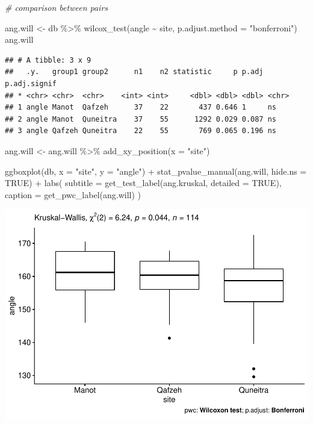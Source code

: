 \documentclass[
]{article}
\newenvironment{Shaded}{\begin{snugshade}}{\end{snugshade}}
\newcommand{\AttributeTok}[1]{\textcolor[rgb]{0.77,0.63,0.00}{#1}}
\newcommand{\CommentTok}[1]{\textcolor[rgb]{0.56,0.35,0.01}{\textit{#1}}}
\newcommand{\ConstantTok}[1]{\textcolor[rgb]{0.00,0.00,0.00}{#1}}
\newcommand{\FunctionTok}[1]{\textcolor[rgb]{0.00,0.00,0.00}{#1}}
\newcommand{\NormalTok}[1]{#1}
\newcommand{\OtherTok}[1]{\textcolor[rgb]{0.56,0.35,0.01}{#1}}
\newcommand{\SpecialCharTok}[1]{\textcolor[rgb]{0.00,0.00,0.00}{#1}}
\newcommand{\StringTok}[1]{\textcolor[rgb]{0.31,0.60,0.02}{#1}}
\begin{document}
\begin{Shaded}
\begin{Highlighting}[]
\CommentTok{\# comparison between pairs}

\NormalTok{ang.will }\OtherTok{\textless{}{-}}\NormalTok{ db }\SpecialCharTok{\%\textgreater{}\%} 
  \FunctionTok{wilcox\_test}\NormalTok{(angle }\SpecialCharTok{\textasciitilde{}}\NormalTok{ site, }\AttributeTok{p.adjust.method =} \StringTok{"bonferroni"}\NormalTok{)}
\NormalTok{ang.will}
\end{Highlighting}
\end{Shaded}

\begin{verbatim}
## # A tibble: 3 x 9
##   .y.   group1 group2      n1    n2 statistic     p p.adj p.adj.signif
## * <chr> <chr>  <chr>    <int> <int>     <dbl> <dbl> <dbl> <chr>       
## 1 angle Manot  Qafzeh      37    22       437 0.646 1     ns          
## 2 angle Manot  Quneitra    37    55      1292 0.029 0.087 ns          
## 3 angle Qafzeh Quneitra    22    55       769 0.065 0.196 ns
\end{verbatim}

\begin{Shaded}
\begin{Highlighting}[]
\NormalTok{ang.will }\OtherTok{\textless{}{-}}\NormalTok{ ang.will }\SpecialCharTok{\%\textgreater{}\%} \FunctionTok{add\_xy\_position}\NormalTok{(}\AttributeTok{x =} \StringTok{"site"}\NormalTok{)}

\FunctionTok{ggboxplot}\NormalTok{(db, }\AttributeTok{x =} \StringTok{"site"}\NormalTok{, }\AttributeTok{y =} \StringTok{"angle"}\NormalTok{) }\SpecialCharTok{+}
  \FunctionTok{stat\_pvalue\_manual}\NormalTok{(ang.will, }\AttributeTok{hide.ns =} \ConstantTok{TRUE}\NormalTok{) }\SpecialCharTok{+}
  \FunctionTok{labs}\NormalTok{(}
    \AttributeTok{subtitle =} \FunctionTok{get\_test\_label}\NormalTok{(ang.kruskal, }\AttributeTok{detailed =} \ConstantTok{TRUE}\NormalTok{),}
    \AttributeTok{caption =} \FunctionTok{get\_pwc\_label}\NormalTok{(ang.will)}
\NormalTok{    )}
\end{Highlighting}
\end{Shaded}

\includegraphics{incisionangles_files/figure-latex/unnamed-chunk-7-1.pdf}
\end{document}
